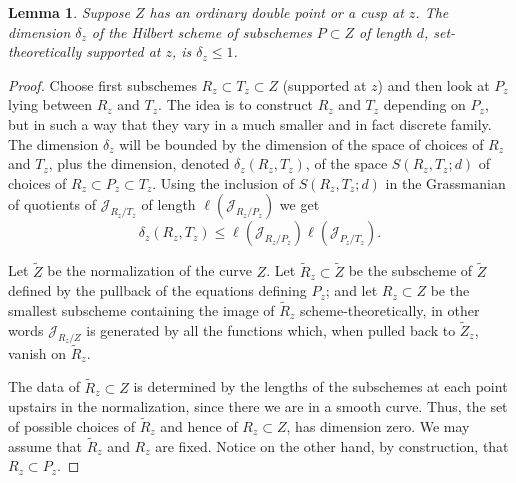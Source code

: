 \documentclass{amsart}
\theoremstyle{plain}
\newtheorem{lemma}[theorem]{Lemma}
\numberwithin{equation}{section}
\begin{document}
\begin{lemma}
Suppose $Z$ has an ordinary double point or a 
cusp at $z$. The dimension $\delta _z$ of the Hilbert scheme
of subschemes $P\subset Z$ of length $d$, 
set-theoretically supported at $z$, is $\delta _z\leq 1$.
\end{lemma}
\begin{proof}
Choose first subschemes 
$R_z\subset T_z\subset Z$ (supported at $z$) and then look at $P_z$ lying between $R_z$ and $T_z$. The idea is to construct $R_z$ and $T_z$ depending on $P_z$, but in
such a way that they vary in a much smaller and in fact discrete family.
The dimension $\delta _z$ will be
bounded by the 
dimension of the space of choices of $R_z$ and $T_z$, plus the dimension, denoted $\delta _z(R_z,T_z)$, of the space $S(R_z,T_z; d)$ 
of choices of $R_z\subset P_z \subset T_z$. Using the inclusion
of $S(R_z,T_z; d)$ in the Grassmanian of quotients of ${{\mathcal J}} _{R_z/T_z}$ of length $\ell  ({{\mathcal J}} _{R_z/P_z})$ we get
\begin{equation}
\label{grassest}
\delta _z(R_z,T_z)\leq \ell ({{\mathcal J}} _{R_z/P_z})\ell ({{\mathcal J}} _{P_z/T_z}).
\end{equation}

Let $\tilde{Z}$ be the normalization of the curve $Z$.
Let $\tilde{R}_z\subset \tilde{Z}$ be the subscheme of $\tilde{Z}$ defined by the pullback
of the equations defining $P_z$; and let $R_z\subset Z$ be the smallest subscheme containing
the image of $\tilde{R}_z$ scheme-theoretically, in other words ${{\mathcal J}} _{R_z/Z}$ is generated by
all the functions which, when pulled back to $\tilde{Z}_z$, vanish on $\tilde{R}_z$.

The data of $\tilde{R}_z\subset Z$ is determined by the lengths
of the subschemes at each point upstairs in the normalization,
since there we are in a smooth curve. 
Thus, the set of possible
choices of $\tilde{R}_z$ and hence of $R_z\subset Z$, has dimension zero.
We may assume that $\tilde{R}_z$ and $R_z$ are fixed.  
Notice on the other hand, by construction, that $R_z\subset P_z$. 


\end{proof}
\end{document}
